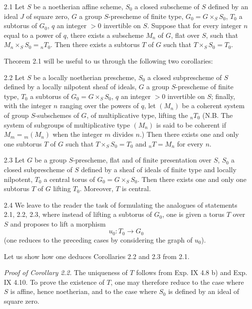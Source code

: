 \begin{theorem}{2.1}\label{XV.2.1}
Let $S$ be a noetherian affine scheme, $S_0$ a closed subscheme of $S$ defined by an ideal $J$ of square zero, $G$ a group $S$-prescheme of finite type, $G_0=G\times_S S_0$, $T_0$ a subtorus of $G_0$, $q$ an integer $>0$ invertible on $S$. Suppose that for every integer $n$ equal to a power of $q$, there exists a subscheme $M_n$ of $G$, flat over $S$, such that $M_n\times_S S_0={}_nT_0$. Then there exists a subtorus $T$ of $G$ such that $T\times_S S_0=T_0$.
\end{theorem}

Theorem 2.1 will be useful to us through the following two corollaries:
\begin{corollary}{2.2}\label{XV.2.2}
Let $S$ be a locally noetherian prescheme, $S_0$ a closed subprescheme of $S$ defined by a locally nilpotent sheaf of ideals, $G$ a group $S$-prescheme of finite type, $T_0$ a subtorus of $G_0=G\times_S S_0$, $q$ an integer $>0$ invertible on $S$; finally, with the integer $n$ ranging over the powers of $q$, let $(M_n)$ be a coherent system of group $S$-subschemes of $G$, of multiplicative type, lifting the ${}_nT_0$ (N.B. The system of subgroups of multiplicative type $(M_n)$ is said to be coherent if $M_m={}_m(M_n)$ when the integer $m$ divides $n$.) Then there exists one and only one subtorus $T$ of $G$ such that $T\times_S S_0=T_0$ and ${}_nT=M_n$ for every $n$.
\end{corollary}

\begin{corollary}{2.3}\label{XV.2.3}
Let $G$ be a group $S$-prescheme, flat and of finite presentation over $S$, $S_0$ a closed subprescheme of $S$ defined by a sheaf of ideals of finite type and locally nilpotent, $T_0$ a central torus of $G_0=G\times_S S_0$. Then there exists one and only one subtorus $T$ of $G$ lifting $T_0$. Moreover, $T$ is central.
\end{corollary}

\begin{remark}{2.4}\label{XV.2.4}
We leave to the reader the task of formulating the analogues of statements 2.1, 2.2, 2.3, where instead of lifting a subtorus of $G_0$, one is given a torus $T$ over $S$ and proposes to lift a morphism
\[
u_0:T_0\to G_0
\]
(one reduces to the preceding cases by considering the graph of $u_0$).
\end{remark}

Let us show how one deduces Corollaries 2.2 and 2.3 from 2.1.
\par\noindent\emph{Proof of Corollary 2.2.}
The uniqueness of $T$ follows from Exp. IX 4.8 b) and Exp. IX 4.10. To prove the existence of $T$, one may therefore reduce to the case where $S$ is affine, hence noetherian, and to the case where $S_0$ is defined by an ideal of square zero.

